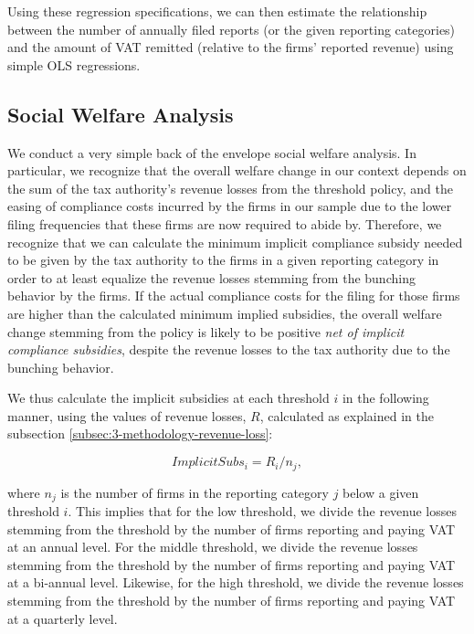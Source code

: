 Using these regression specifications, we can then estimate the relationship between the number of annually filed reports (or the given reporting categories) and the amount of VAT remitted (relative to the firms' reported revenue) using simple OLS regressions.

\subsection{Social Welfare Analysis}
\label{subsec:3-methodology-welfare-analysis}
We conduct a very simple back of the envelope social welfare analysis. In particular, we recognize that the overall welfare change in our context depends on the sum of the tax authority's revenue losses from the threshold policy, and the easing of compliance costs incurred by the firms in our sample due to the lower filing frequencies that these firms are now required to abide by. Therefore, we recognize that we can calculate the minimum implicit compliance subsidy needed to be given by the tax authority to the firms in a given reporting category in order to at least equalize the revenue losses stemming from the bunching behavior by the firms. If the actual compliance costs for the filing for those firms are higher than the calculated minimum implied subsidies, the overall welfare change stemming from the policy is likely to be positive \textit{net of implicit compliance subsidies}, despite the revenue losses to the tax authority due to the bunching behavior.


We thus calculate the implicit subsidies at each threshold $i$ in the following manner, using the values of revenue losses, $R$, calculated as explained in the subsection \ref{subsec:3-methodology-revenue-loss}:

\begin{equation}
ImplicitSubs_i = R_i / n_j,
\end{equation}

where $n_j$ is the number of firms in the reporting category $j$ below a given threshold $i$. This implies that for the low threshold, we divide the revenue losses stemming from the threshold by the number of firms reporting and paying VAT at an annual level. For the middle threshold, we divide the revenue losses stemming from the threshold by the number of firms reporting and paying VAT at a bi-annual level. Likewise, for the high threshold, we divide the revenue losses stemming from the threshold by the number of firms reporting and paying VAT at a quarterly level. 

